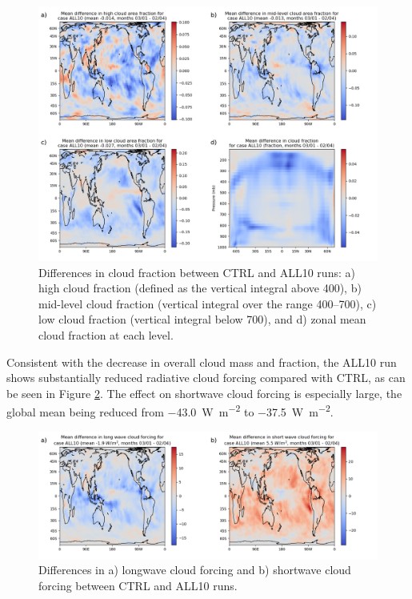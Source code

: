 \documentclass [11pt, proquest] {uwthesis}[2020/02/24]
\begin{document}
\begin{figure}
    \centering
    \includegraphics[width=6.5in]{Figure4.png}
    \caption[Differences in cloud fraction between CTRL and ALL10 runs]{Differences in cloud fraction between CTRL and ALL10 runs: a) high cloud fraction (defined as the vertical integral above \SI{400}{\millibar}), b) mid-level cloud fraction (vertical integral over the range \SIrange[range-phrase=--,range-units=single]{400}{700}{\millibar}), c) low cloud fraction (vertical integral below \SI{700}{\millibar}), and d) zonal mean cloud fraction at each level.}
    \label{fig:all10-cld-map}
\end{figure}

Consistent with the decrease in overall cloud mass and fraction, the ALL10 run shows substantially reduced radiative cloud forcing compared with CTRL, as can be seen in Figure \ref{fig:all10-cf-map}. The effect on shortwave cloud forcing is especially large, the global mean being reduced from \SI{-43.0}{\watt\per\meter\squared} to \SI{-37.5}{\watt\per\meter\squared}.

\begin{figure}
    \centering
    \includegraphics[width=6.5in]{Figure5.png}
    \caption[Differences in radiative cloud forcing between CTRL and ALL10 runs]{Differences in a) longwave cloud forcing and b) shortwave cloud forcing between CTRL and ALL10 runs.}
    \label{fig:all10-cf-map}
\end{figure}
\end{document}
